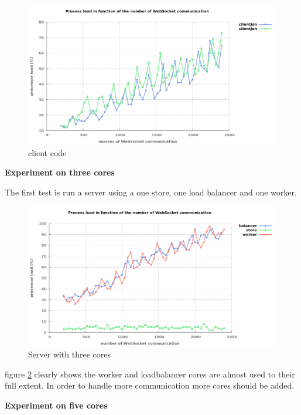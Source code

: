 \begin{figure}[H]
	\centering
		\includegraphics[width=\textwidth]{./Figures/WS_client_rising.png}
	\caption[Simple WebSocket client]{client code}
	\label{fig:WS_client_rising}
\end{figure}

\textbf{Experiment on three cores}

The first test is run a server using a one store, one load balancer and one
worker.

\begin{figure}[H]
	\centering
		\includegraphics[width=\textwidth]{./Figures/WS_server_1rising.png}
	\caption[WebSocket server on three cores]{Server with three cores}
	\label{fig:WS_server_1rising}
\end{figure}

figure \ref{fig:WS_server_1rising} clearly shows the worker and loadbalancer
cores are almost used to their full extent. In order to handle more communication more
cores should be added. 

\textbf{Experiment on five cores}


